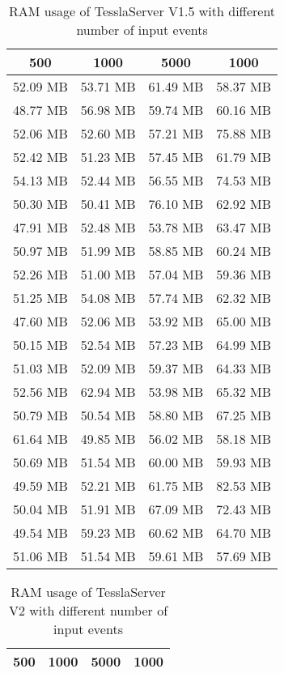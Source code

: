 \begin{table}[!htb]
  \centering
  \caption{RAM usage of TesslaServer V1.5 with different number of input events}
  \label{table:tessla_server_v1_5_events_ram_usage_data}
  \begin{tabular}{llll}
    \multicolumn{1}{c}{500} & \multicolumn{1}{c}{1000} & \multicolumn{1}{c}{5000} & \multicolumn{1}{c}{1000}\\ \hline
    52.09 MB & 53.71 MB & 61.49 MB & 58.37 MB \\
    48.77 MB & 56.98 MB & 59.74 MB & 60.16 MB \\
    52.06 MB & 52.60 MB & 57.21 MB & 75.88 MB \\
    52.42 MB & 51.23 MB & 57.45 MB & 61.79 MB \\
    54.13 MB & 52.44 MB & 56.55 MB & 74.53 MB \\
    50.30 MB & 50.41 MB & 76.10 MB & 62.92 MB \\
    47.91 MB & 52.48 MB & 53.78 MB & 63.47 MB \\
    50.97 MB & 51.99 MB & 58.85 MB & 60.24 MB \\
    52.26 MB & 51.00 MB & 57.04 MB & 59.36 MB \\
    51.25 MB & 54.08 MB & 57.74 MB & 62.32 MB \\
    47.60 MB & 52.06 MB & 53.92 MB & 65.00 MB \\
    50.15 MB & 52.54 MB & 57.23 MB & 64.99 MB \\
    51.03 MB & 52.09 MB & 59.37 MB & 64.33 MB \\
    52.56 MB & 62.94 MB & 53.98 MB & 65.32 MB \\
    50.79 MB & 50.54 MB & 58.80 MB & 67.25 MB \\
    61.64 MB & 49.85 MB & 56.02 MB & 58.18 MB \\
    50.69 MB & 51.54 MB & 60.00 MB & 59.93 MB \\
    49.59 MB & 52.21 MB & 61.75 MB & 82.53 MB \\
    50.04 MB & 51.91 MB & 67.09 MB & 72.43 MB \\
    49.54 MB & 59.23 MB & 60.62 MB & 64.70 MB \\
    51.06 MB & 51.54 MB & 59.61 MB & 57.69 MB
  \end{tabular}
\end{table}

\begin{table}[!htb]
  \centering
  \caption{RAM usage of TesslaServer V2 with different number of input events}
  \label{table:tessla_server_v2_events_ram_usage_data}
  \begin{tabular}{llll}
    \multicolumn{1}{c}{500} & \multicolumn{1}{c}{1000} & \multicolumn{1}{c}{5000} & \multicolumn{1}{c}{1000}\\ \hline
  \end{tabular}
\end{table}

